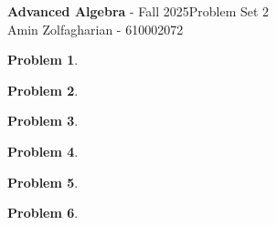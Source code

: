 \documentclass[12pt]{article}
\newcommand{\customanswer}[1]{%
\begin{problem}
\end{problem}

}
\newtheorem{problem}{Problem}
\begin{document}
\noindent \textbf{Advanced Algebra} - Fall 2025\hfill Problem Set 2\\
Amin Zolfagharian - 610002072

\hrulefill

\customanswer{1}
\customanswer{2}
\customanswer{3}
\customanswer{4}
\customanswer{5}
\customanswer{6}
\end{document}

